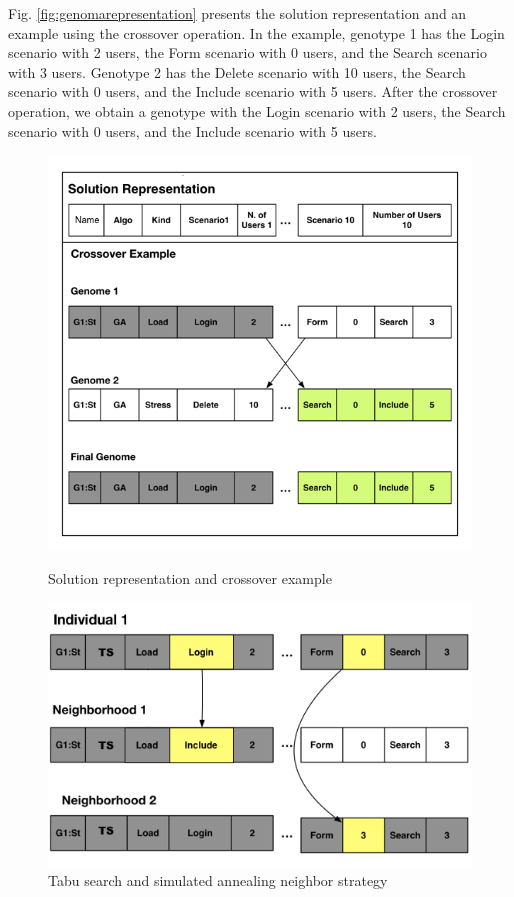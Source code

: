Fig. \ref{fig:genomarepresentation} presents the solution representation and an example using the crossover operation. In the example, genotype 1 has the Login scenario with 2 users, the Form scenario with 0 users, and the Search scenario with 3 users. Genotype 2 has the Delete scenario with 10 users, the Search scenario with 0 users, and the Include scenario with 5 users. After the crossover operation, we obtain a genotype with the Login scenario with 2 users, the Search scenario with 0 users, and the Include scenario with 5 users.

\begin{figure}[h]
\begin{minipage}{.5\textwidth}
\centering
\includegraphics[width=1\textwidth]{./images/genomerepresentation1.png}
\caption{Solution representation and crossover example}
\label{fig:genomarepresentation}
\end{minipage}
\begin{minipage}{.5\textwidth}
\centering
\includegraphics[width=1\textwidth]{./images/neighbor.png}
\caption{Tabu search and simulated annealing neighbor strategy}
\label{fig:neighbourtaby}
\end{minipage}
\end{figure}

